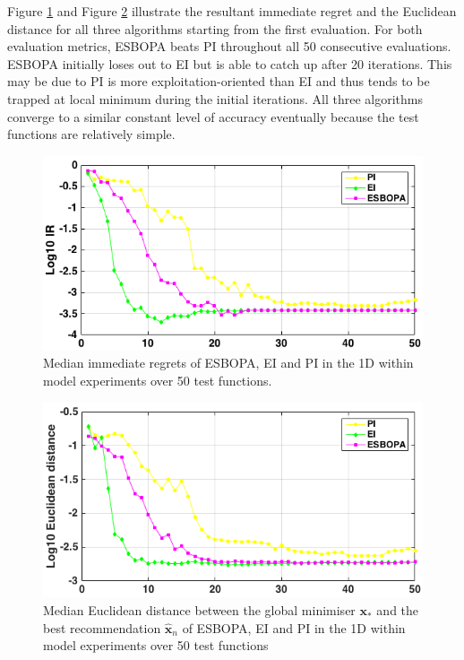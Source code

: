 \documentclass[a4paper,11pt]{report}
\begin{document}
\noindent
Figure \ref{1DtestIR} and Figure \ref{1DtestXnorm2} illustrate the resultant immediate regret and the Euclidean distance for all three algorithms starting from the first evaluation. For both evaluation metrics, ESBOPA beats PI throughout all 50 consecutive evaluations. ESBOPA initially loses out to EI but is able to catch up after 20 iterations. This may be due to PI is more exploitation-oriented than EI and thus tends to be trapped at local minimum during the initial iterations. All three algorithms converge to a similar constant level of accuracy eventually because the test functions are relatively simple. 
\\
\begin{figure} [H]
\label{1DtestIR}
	\centering
	 \includegraphics[width=0.8\linewidth]{1D_ESBOPAV4_IR.png}
\caption{ Median immediate regrets of ESBOPA, EI and PI in the 1D within model experiments over 50 test functions.}
\end{figure}

\begin{figure} [H]
\label{1DtestXnorm2}
	\centering
	 \includegraphics[width=0.8\linewidth]{1D_ESBOPAV4_Xnorm.png}
\caption{ Median Euclidean distance between the global minimiser $\mathbf{x}_{*}$ and the best recommendation $ \hat{\mathbf{x}}_{n}$ of ESBOPA, EI and PI in the 1D within model experiments over 50 test functions}
\end{figure}
 \newpage
\end{document}
